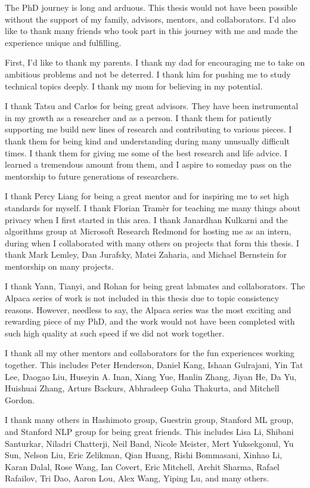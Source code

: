 
The PhD journey is long and arduous. 
This thesis would not have been possible without the support of my family, advisors, mentors, and collaborators.
I'd also like to thank many friends who took part in this journey with me and made the experience unique and fulfilling.

First, I'd like to thank my parents.
I thank my dad for encouraging me to take on ambitious problems and not be deterred.
I thank him for pushing me to study technical topics deeply.
I thank my mom for believing in my potential.

I thank Tatsu and Carlos for being great advisors.
They have been instrumental in my growth as a researcher and as a person.
I thank them for patiently supporting me build new lines of research and contributing to various pieces.
I thank them for being kind and understanding during many unusually difficult times.
I thank them for giving me some of the best research and life advice.
I learned a tremendous amount from them, and I aspire to someday pass on the mentorship to future generations of researchers.

I thank Percy Liang for being a great mentor and for inspiring me to set high standards for myself.
I thank Florian Tramèr for teaching me many things about privacy when I first started in this area.
I thank Janardhan Kulkarni and the algorithms group at Microsoft Research Redmond for hosting me as an intern, during when I collaborated with many others on projects that form this thesis.
I thank Mark Lemley, Dan Jurafsky, Matei Zaharia, and Michael Bernstein for mentorship on many projects.

I thank Yann, Tianyi, and Rohan for being great labmates and collaborators.
The Alpaca series of work is not included in this thesis due to topic consistency reasons. 
However, needless to say, the Alpaca series was the most exciting and rewarding piece of my PhD, and the work would not have been completed with such high quality at such speed if we did not work together.

I thank all my other mentors and collaborators for the fun experiences working together. 
This includes Peter Henderson, Daniel Kang, Ishaan Gulrajani, Yin Tat Lee, Daogao Liu, Huseyin A. Inan, Xiang Yue, Hanlin Zhang, Jiyan He, Da Yu, Huishuai Zhang, Arturs Backurs, Abhradeep Guha Thakurta, and Mitchell Gordon.

I thank many others in Hashimoto group, Guestrin group, Stanford ML group, and Stanford NLP group for being great friends. 
This includes Lisa Li, Shibani Santurkar, Niladri Chatterji, Neil Band, Nicole Meister, Mert Yuksekgonul, Yu Sun, Nelson Liu, Eric Zelikman, Qian Huang, Rishi Bommasani, Xinhao Li, Karan Dalal, Rose Wang, Ian Covert, Eric Mitchell, Archit Sharma, Rafael Rafailov, Tri Dao, Aaron Lou, Alex Wang, Yiping Lu, and many others.

